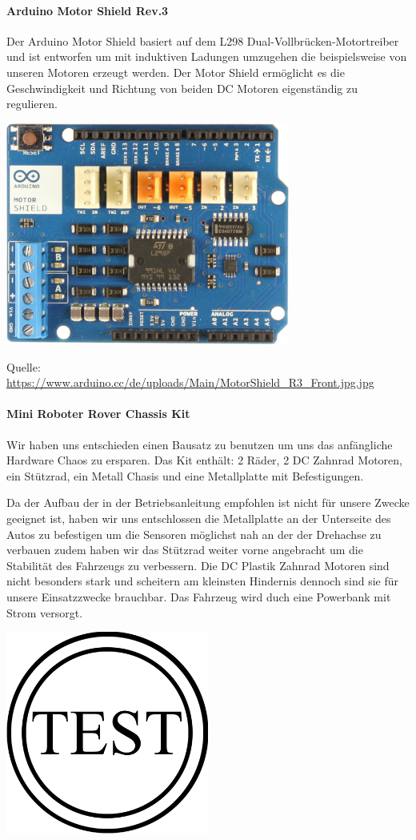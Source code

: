 \documentclass[12pt]{article}
\newcommand*{\quelle}{%
  \footnotesize Quelle: 
}
\begin{document}
\paragraph{Arduino Motor Shield Rev.3} Der Arduino Motor Shield basiert auf dem L298 Dual-Vollbrücken-Motortreiber und ist entworfen um mit induktiven Ladungen umzugehen die beispielsweise von unseren Motoren erzeugt werden. Der Motor Shield ermöglicht es die Geschwindigkeit und Richtung von beiden DC Motoren eigenständig zu regulieren.

\vspace{0.5cm}
\includegraphics[width=0.7\textwidth]{MotorShield_Front.jpg}

\quelle\url{https://www.arduino.cc/de/uploads/Main/MotorShield_R3_Front.jpg.jpg}

\paragraph{Mini Roboter Rover Chassis Kit} Wir haben uns entschieden einen Bausatz zu benutzen um uns das anfängliche Hardware Chaos zu ersparen. Das Kit enthält: 2 Räder, 2 DC Zahnrad Motoren, ein Stützrad, ein Metall Chasis und eine Metallplatte mit Befestigungen.

Da der Aufbau der in der Betriebsanleitung empfohlen ist nicht für unsere Zwecke geeignet ist, haben wir uns entschlossen die Metallplatte an der Unterseite des Autos zu befestigen um die Sensoren möglichst nah an der der Drehachse zu verbauen zudem haben wir das Stützrad weiter vorne angebracht um die Stabilität des Fahrzeugs zu verbessern. Die DC Plastik Zahnrad Motoren sind nicht besonders stark und scheitern am kleinsten Hindernis dennoch sind sie für unsere Einsatzzwecke brauchbar. Das Fahrzeug wird duch eine Powerbank mit Strom versorgt.
\vspace{0.5cm}

\includegraphics[width=0.5\textwidth]{example.png}
\end{document}
